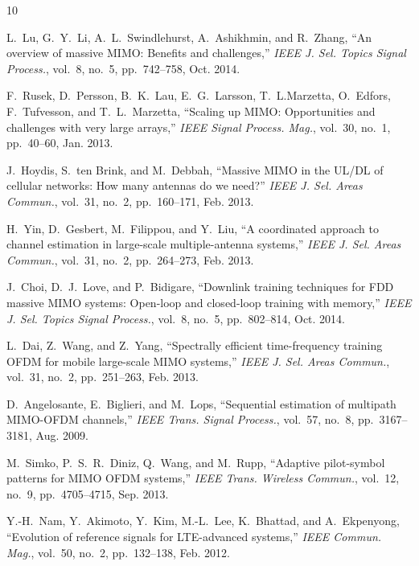 \documentclass[final]{IEEEtran}
\begin{document}
\begin{thebibliography}{10}

 L.~Lu, G.~Y.~Li, A.~L.~Swindlehurst, A.~Ashikhmin, and R.~Zhang, ``An overview of
 massive MIMO: Benefits and challenges,'' {\em IEEE J. Sel. Topics Signal Process.},
 vol.~8, no.~5, pp.~742--758, Oct. 2014.

 F.~Rusek, D.~Persson, B.~K.~Lau, E.~G.~Larsson, T.~L.Marzetta, O.~Edfors,
 F.~Tufvesson, and T.~L.~Marzetta, ``Scaling up MIMO: Opportunities and challenges
 with very large arrays,'' {\em IEEE Signal Process. Mag.}, vol.~30, no.~1,
 pp.~40--60, Jan. 2013.

 J.~Hoydis, S.~ten Brink, and M.~Debbah, ``Massive MIMO in the UL/DL of cellular
 networks: How many antennas do we need?'' {\em IEEE J. Sel. Areas Commun.},
 vol.~31, no.~2, pp.~160--171, Feb. 2013.

 H.~Yin, D.~Gesbert, M.~Filippou, and Y.~Liu, ``A coordinated approach to channel
 estimation in large-scale multiple-antenna systems,'' {\em IEEE J. Sel. Areas
 Commun.}, vol.~31, no.~2, pp.~264--273, Feb. 2013.

 J.~Choi, D.~J.~Love, and P.~Bidigare, ``Downlink training techniques for FDD
 massive MIMO systems: Open-loop and closed-loop training with memory,''
 {\em IEEE J. Sel. Topics Signal Process.}, vol.~8, no.~5, pp.~802--814, Oct. 2014.

 L.~Dai, Z.~Wang, and Z.~Yang, ``Spectrally efficient time-frequency training OFDM
 for mobile large-scale MIMO systems,'' {\em IEEE J. Sel. Areas Commun.}, vol.~31,
 no.~2, pp.~251--263, Feb. 2013.

 D.~Angelosante, E.~Biglieri, and M.~Lops, ``Sequential estimation of multipath
 MIMO-OFDM channels,'' {\em IEEE Trans. Signal Process.}, vol.~57, no.~8,
 pp.~3167--3181, Aug. 2009.

 M.~Simko, P.~S.~R.~Diniz, Q.~Wang, and M.~Rupp, ``Adaptive pilot-symbol patterns for
 MIMO OFDM systems,'' {\em IEEE Trans. Wireless Commun.}, vol.~12, no.~9,
 pp.~4705--4715, Sep. 2013.

 Y.-H.~Nam, Y.~Akimoto, Y.~Kim, M.-L.~Lee, K.~Bhattad, and A.~Ekpenyong, ``Evolution
 of reference signals for LTE-advanced systems,'' {\em IEEE Commun. Mag.}, vol.~50,
 no.~2, pp.~132--138, Feb. 2012.


\end{thebibliography}
\end{document}
